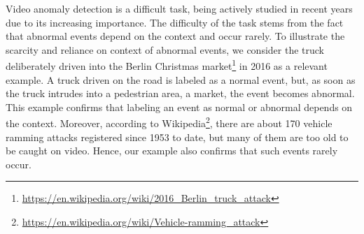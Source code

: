 \documentclass[10pt,twocolumn,letterpaper]{article}
\begin{document}
Video anomaly detection is a difficult task, being actively studied in recent years \cite{Acsintoae-CVPR-2022,Dong-Access-2020,Doshi-CVPRW-2020a,Georgescu-CVPR-2021,Georgescu-TPAMI-2021,Gong-ICCV-2019,Ionescu-CVPR-2019,Ionescu-WACV-2019,Ionescu-ICCV-2017,Ji-IJCNN-2020,Lee-TIP-2019,Li-ECCV-2022,Liu-ICCV-2021,Lu-ECCV-2020,Nguyen-ICCV-2019,Pang-CVPR-2020,Park-CVPR-2020,Ramachandra-WACV-2020a,Ramachandra-PAMI-2020,Ristea-CVPR-2022,Smeureanu-ICIAP-2017,Sun-ACMMM-2020,Tang-PRL-2020,Vu-AAAI-2019,Wang-ACMMM-2020,Wu-TNNLS-2019,Yu-ACMMM-2020,Yu-CVPR-2022,Zaheer-CVPR-2020,Zaheer-ECCV-2020,Zaheer-CVPR-2022} due to its increasing importance. The difficulty of the task stems from the fact that abnormal events depend on the context and occur rarely. To illustrate the scarcity and reliance on context of abnormal events, we consider the truck deliberately driven into the Berlin Christmas market\footnote{\url{https://en.wikipedia.org/wiki/2016_Berlin_truck_attack}} in 2016 as a relevant example. A truck driven on the road is labeled as a normal event, but, as soon as the truck intrudes into a pedestrian area, \eg a market, the event becomes abnormal. This example confirms that labeling an event as normal or abnormal depends on the context. Moreover, according to Wikipedia\footnote{\url{https://en.wikipedia.org/wiki/Vehicle-ramming_attack}}, there are about 170 vehicle ramming attacks registered since 1953 to date, but many of them are too old to be caught on video. Hence, our example also confirms that such events rarely occur.
\end{document}
